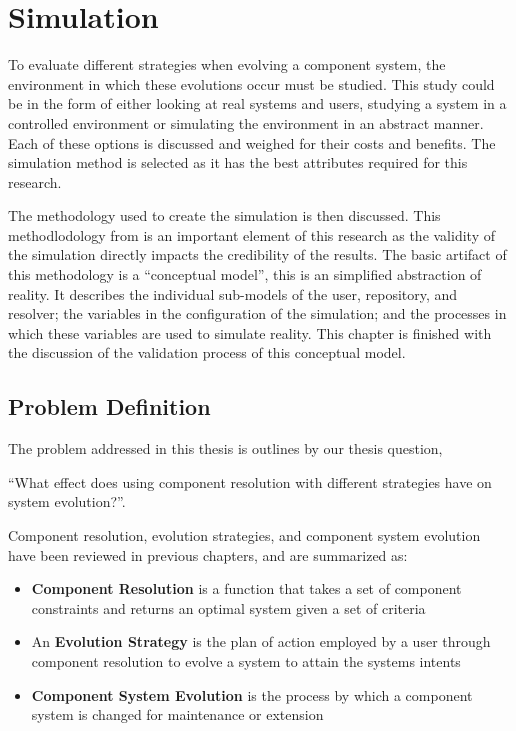 \chapter{Simulation}
\label{simulation}
{}To evaluate different strategies when evolving a component system, the environment in which these evolutions occur must be studied.
{}This study could be in the form of either looking at real systems and users, studying a system in a controlled environment or simulating the environment in an abstract manner.
{}Each of these options is discussed and weighed for their costs and benefits.
{}The simulation method is selected as it has the best attributes required for this research.

{}The methodology used to create the simulation is then discussed.
{}This methodlodology from \cite{Law2005} is an important element of this research as the validity of the simulation directly impacts the credibility of the results.   
{}The basic artifact of this methodology is a ``conceptual model'', this is an simplified abstraction of reality.
{}It describes the individual sub-models of the user, repository, and resolver; the variables in the configuration of the simulation;
{}and the processes in which these variables are used to simulate reality.
{}This chapter is finished with the discussion of the validation process of this conceptual model.

\section{Problem Definition}
The problem addressed in this thesis is outlines by our thesis question,

``What effect does using component resolution with different strategies have on system evolution?''.

Component resolution, evolution strategies, and component system evolution have been reviewed in previous chapters, and are summarized as:
\begin{itemize}
  \item \textbf{Component Resolution} is a function that takes a set of component constraints and returns an optimal system given a set of criteria
  \item An \textbf{Evolution Strategy} is the plan of action employed by a user through component resolution to evolve a system to attain the systems intents
  \item \textbf{Component System Evolution} is the process by which a component system is changed for maintenance or extension 
\end{itemize}

